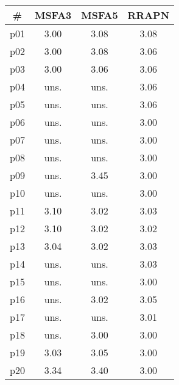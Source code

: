 \begin{tabular}{cccc}
\toprule
\textbf{\#} & \textbf{MSFA3} & \textbf{MSFA5} & \textbf{RRAPN}\\
\midrule
p01 & 3.00 & 3.08 & 3.08\\
p02 & 3.00 & 3.08 & 3.06\\
p03 & 3.00 & 3.06 & 3.06\\
p04 & uns. & uns. & 3.06\\
p05 & uns. & uns. & 3.06\\
p06 & uns. & uns. & 3.00\\
p07 & uns. & uns. & 3.00\\
p08 & uns. & uns. & 3.00\\
p09 & uns. & 3.45 & 3.00\\
p10 & uns. & uns. & 3.00\\
p11 & 3.10 & 3.02 & 3.03\\
p12 & 3.10 & 3.02 & 3.02\\
p13 & 3.04 & 3.02 & 3.03\\
p14 & uns. & uns. & 3.03\\
p15 & uns. & uns. & 3.00\\
p16 & uns. & 3.02 & 3.05\\
p17 & uns. & uns. & 3.01\\
p18 & uns. & 3.00 & 3.00\\
p19 & 3.03 & 3.05 & 3.00\\
p20 & 3.34 & 3.40 & 3.00\\
\bottomrule
\end{tabular}

